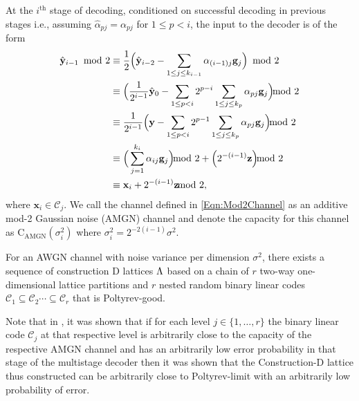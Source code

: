 At the $i^{\text{th}}$ stage of decoding, conditioned on successful decoding in previous stages i.e., assuming $\hat{\alpha}_{pj}=\alpha_{pj}$ for $1\leq p < i$, the input to the decoder is of the form
\begin{align}
\hat{\mathbf{y}}_{i-1}\! \mod 2&\equiv\frac{1}{2}\Big(\hat{\mathbf{y}}_{i-2}-\sum_{1\leq j\leq k_{i-1}}\alpha_{(i-1)j}\mathbf{g}_j\Big)\!\mod 2\notag\\
&\equiv \Big( \frac{1}{2^{i-1}}\hat{\mathbf{y}}_{0}-\sum_{1\leq p< i}2^{p-i}\sum_{1\leq j\leq k_{p}}\alpha_{pj}\mathbf{g}_j \Big) \hspace{-8pt}\mod 2\notag\\
&\equiv\frac{1}{2^{i-1}}\Big( \mathbf{y}-\sum_{1\leq p< i}2^{p-1}\sum_{1\leq j\leq k_{p}}\alpha_{pj}\mathbf{g}_j \Big) \hspace{-8pt}\mod 2\notag\\
&\equiv\Big(\sum_{j=1}^{k_{i}}\alpha_{ij}\mathbf{g}_j \Big) \hspace{-8pt}\mod 2 + \Big( 2^{-(i-1)}\mathbf{z} \Big) \hspace{-8pt}\mod 2\notag\\
&\equiv\mathbf{x}_{i}+2^{-(i-1)}\mathbf{z} \hspace{-8pt}\mod 2,
\label{Eqn:Mod2Channel}
\end{align}
where $\mathbf{x}_{i}\in\mathcal{C}_{j}$. We call the channel defined in \eqref{Eqn:Mod2Channel} as an additive mod-2 Gaussian noise (AMGN) channel \cite{forney2000} and denote the capacity for this channel as  $\text{C}_{\text{AMGN}}(\sigma^{2}_{i})$ where $\sigma_{i}^{2}=2^{-2(i-1)}\sigma^2$.

\begin{theorem}
For an AWGN channel with noise variance per dimension $\sigma^{2}$, there exists a sequence of construction D lattices $\Lambda$ based on a chain of $r$ two-way one-dimensional lattice partitions and $r$ nested random binary linear codes $\mathcal{C}_{1}\subseteq \mathcal{C}_{2}\cdots \subseteq \mathcal{C}_{r}$ that is Poltyrev-good.
\end{theorem}

\begin{remark}\label{Rmk:Forney_proof}
    Note that in \cite{forney2000}, it was shown that if for each level $j\in\{1,\ldots,r\}$ the binary linear code $\mathcal{C}_{j}$ at that respective level is arbitrarily close to the capacity of the respective AMGN channel and has an arbitrarily low error probability in that stage of the multistage decoder then it was shown that the Construction-D lattice thus constructed can be arbitrarily close to Poltyrev-limit with an arbitrarily low probability of error.
\end{remark}

